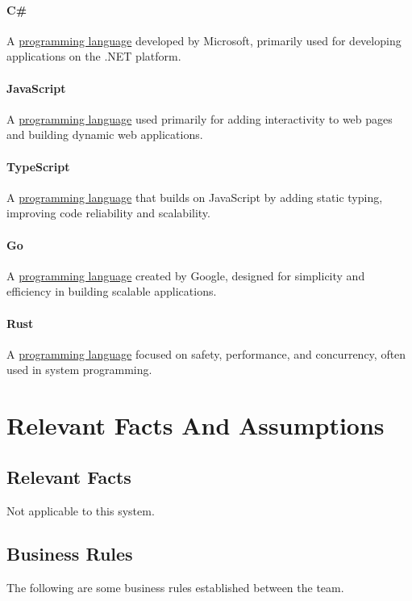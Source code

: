 \documentclass[12pt]{article}
\begin{document}
\paragraph*{C\#}
A \hyperref[term:progl]{programming language} developed by Microsoft, primarily used for developing applications on the .NET platform.

\paragraph*{JavaScript}
\label{term:JS}
A \hyperref[term:progl]{programming language} used primarily for adding interactivity to web pages and building dynamic web applications.

\paragraph*{TypeScript}
A \hyperref[term:progl]{programming language} that builds on JavaScript by adding static typing, improving code reliability and scalability.

\paragraph*{Go}
A \hyperref[term:progl]{programming language} created by Google, designed for simplicity and efficiency in building scalable applications.

\paragraph*{Rust}
A \hyperref[term:progl]{programming language} focused on safety, performance, and concurrency, often used in system programming.



\section{Relevant Facts And Assumptions}
\subsection{Relevant Facts}
Not applicable to this system.
\subsection{Business Rules}

The following are some business rules established between the team.
\end{document}
